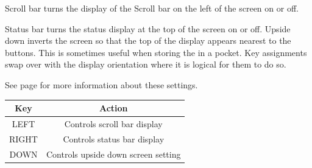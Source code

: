 Scroll bar turns the display of the Scroll bar on the left of the screen on or off.

Status bar turns the status display at the top of the screen on or off. Upside down inverts the screen so that the top of the display appears nearest to the buttons.  This is sometimes useful when storing the \dap in a pocket.  Key assignments swap over with the display orientation where it is logical for them to do so.

See page \pageref{ref:Displayoptions} for more information about these settings.
\begin{center}
  \begin{tabular}{@{}cc@{}}\toprule
    \textbf{Key} & \textbf{Action} \\\midrule
    LEFT & Controls scroll bar display \\
    RIGHT & Controls status bar display \\
    DOWN & Controls upside down screen setting \\\bottomrule
  \end{tabular}
\end{center}

